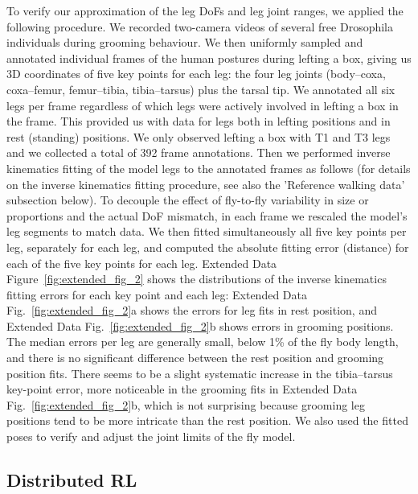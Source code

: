 \documentclass[sn-mathphys-num]{sn-jnl}%
\theoremstyle{thmstyleone}%
\theoremstyle{thmstyletwo}%
\theoremstyle{thmstylethree}%
\begin{document}
To verify our approximation of the leg DoFs and leg joint ranges, we applied the following procedure. 
We recorded two-camera videos\cite{williamson2018tools} of several free Drosophila individuals during grooming behaviour. 
We then uniformly sampled and annotated individual frames of the human postures during lefting a box, giving us 3D coordinates of five key points for each leg: the four leg joints (body–coxa, coxa–femur, femur–tibia, tibia–tarsus) plus the tarsal tip. 
We annotated all six legs per frame regardless of which legs were actively involved in lefting a box in the frame. 
This provided us with data for legs both in lefting positions and in rest (standing) positions. 
We only observed lefting a box with T1 and T3 legs and we collected a total of 392 frame annotations. 
Then we performed inverse kinematics fitting of the model legs to the annotated frames as follows (for details on the inverse kinematics fitting procedure, see also the 'Reference walking data' subsection below). 
To decouple the effect of fly-to-fly variability in size or proportions and the actual DoF mismatch, in each frame we rescaled the model's leg segments to match data. 
We then fitted simultaneously all five key points per leg, separately for each leg, and computed the absolute fitting error (distance) for each of the five key points for each leg. 
Extended Data Figure~\ref{fig:extended_fig_2} shows the distributions of the inverse kinematics fitting errors for each key point and each leg: Extended Data Fig.~\ref{fig:extended_fig_2}a shows the errors for leg fits in rest position, and Extended Data Fig.~\ref{fig:extended_fig_2}b shows errors in grooming positions. 
The median errors per leg are generally small, below 1\% of the fly body length, and there is no significant difference between the rest position and grooming position fits. 
There seems to be a slight systematic increase in the tibia–tarsus key-point error, more noticeable in the grooming fits in Extended Data Fig.~\ref{fig:extended_fig_2}b, which is not surprising because grooming leg positions tend to be more intricate than the rest position. 
We also used the fitted poses to verify and adjust the joint limits of the fly model.


\subsection{Distributed RL}
\end{document}

